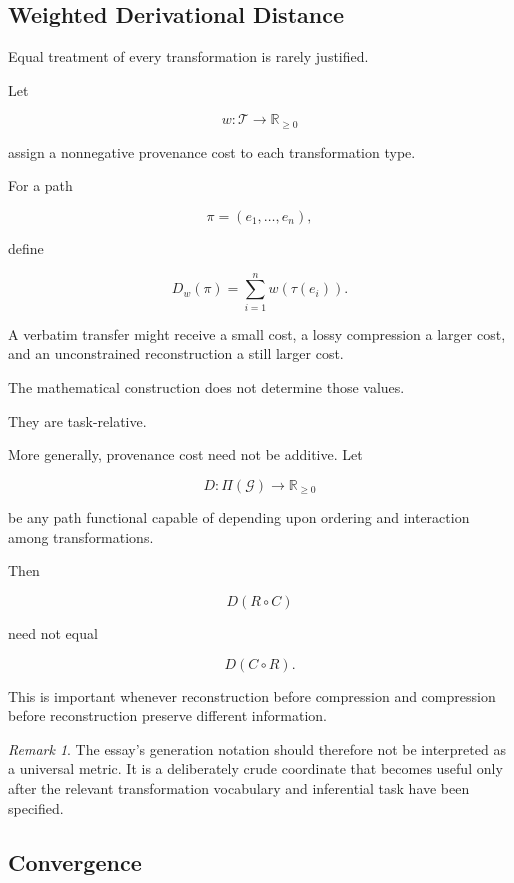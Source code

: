\documentclass[
  11pt,
  a4paper,
  DIV=12,
  BCOR=0mm,
  parskip=half-
]{scrartcl}
\newcommand{\graphG}{\mathcal G}
\theoremstyle{definition}
\theoremstyle{plain}
\theoremstyle{remark}
\newtheorem{remark}[definition]{Remark}
\begin{document}
\subsection{Weighted Derivational Distance}
\label{app:weighted-provenance}

Equal treatment of every transformation is rarely justified.

Let

\[
  w:\mathcal T\to\mathbb R_{\geq 0}
\]

assign a nonnegative provenance cost to each transformation type.

For a path

\[
  \pi=(e_1,\ldots,e_n),
\]

define

\[
  D_w(\pi)
  =
  \sum_{i=1}^{n}w(\tau(e_i)).
\]

A verbatim transfer might receive a small cost, a lossy compression a larger
cost, and an unconstrained reconstruction a still larger cost.

The mathematical construction does not determine those values.

They are task-relative.

More generally, provenance cost need not be additive. Let

\[
  D:\Pi(\graphG)\to\mathbb R_{\geq 0}
\]

be any path functional capable of depending upon ordering and interaction
among transformations.

Then

\[
  D(R\circ C)
\]

need not equal

\[
  D(C\circ R).
\]

This is important whenever reconstruction before compression and compression
before reconstruction preserve different information.

\begin{remark}
The essay's generation notation should therefore not be interpreted as a
universal metric. It is a deliberately crude coordinate that becomes useful
only after the relevant transformation vocabulary and inferential task have
been specified.
\end{remark}


\subsection{Convergence}
\label{app:convergence}
\end{document}

